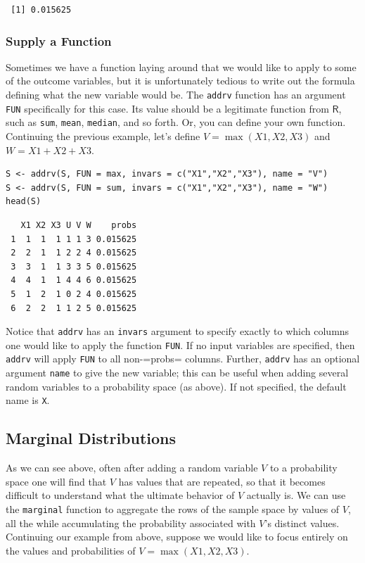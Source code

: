 \documentclass[captions=tableheading]{scrbook}
\begin{document}
\begin{verbatim}
 [1] 0.015625
\end{verbatim}
\subsubsection{Supply a Function}
\label{sec-4-9-1-2}


Sometimes we have a function laying around that we would like to apply to some of the outcome variables, but it is unfortunately tedious to write out the formula defining what the new variable would be. The \texttt{addrv} function has an argument \texttt{FUN} specifically for this case. Its value should be a legitimate function from \(\mathsf{R}\), such as \texttt{sum}, \texttt{mean}, \texttt{median}, and so forth. Or, you can define your own function. Continuing the previous example, let's define \(V=\max(X1,X2,X3)\) and \(W=X1+X2+X3\). 


\begin{verbatim}
S <- addrv(S, FUN = max, invars = c("X1","X2","X3"), name = "V") 
S <- addrv(S, FUN = sum, invars = c("X1","X2","X3"), name = "W") 
head(S)
\end{verbatim}

\begin{verbatim}
   X1 X2 X3 U V W    probs
 1  1  1  1 1 1 3 0.015625
 2  2  1  1 2 2 4 0.015625
 3  3  1  1 3 3 5 0.015625
 4  4  1  1 4 4 6 0.015625
 5  1  2  1 0 2 4 0.015625
 6  2  2  1 1 2 5 0.015625
\end{verbatim}

Notice that \texttt{addrv} has an \texttt{invars} argument to specify exactly to which columns one would like to apply the function \texttt{FUN}. If no input variables are specified, then \texttt{addrv} will apply \texttt{FUN} to all non-=probs= columns. Further, \texttt{addrv} has an optional argument \texttt{name} to give the new variable; this can be useful when adding several random variables to a probability space (as above). If not specified, the default name is \texttt{X}.
\subsection{Marginal Distributions}
\label{sec-4-9-2}


As we can see above, often after adding a random variable \(V\) to a probability space one will find that \(V\) has values that are repeated, so that it becomes difficult to understand what the ultimate behavior of \(V\) actually is. We can use the \texttt{marginal} function to aggregate the rows of the sample space by values of \(V\), all the while accumulating the probability associated with \(V\)'s distinct values. Continuing our example from above, suppose we would like to focus entirely on the values and probabilities of \(V=\max(X1,X2,X3)\). 
\end{document}
